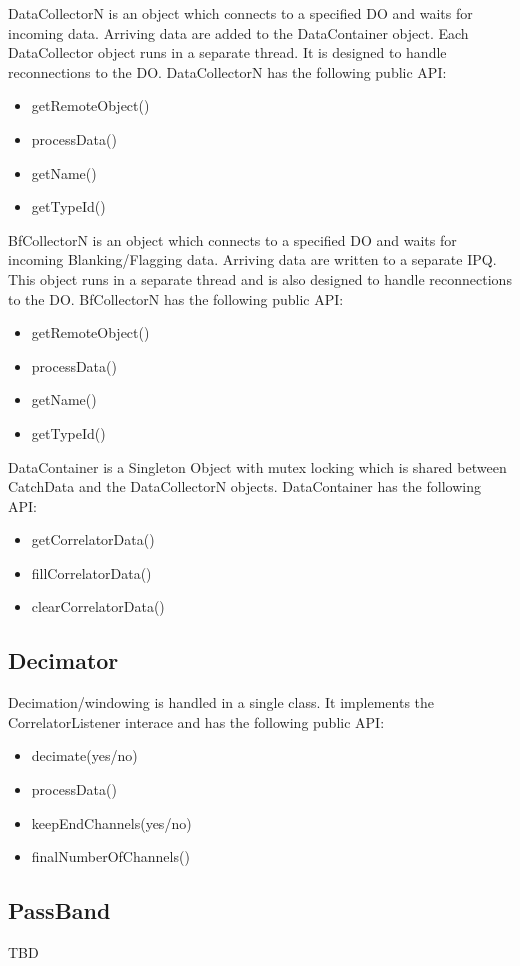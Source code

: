 \documentclass[11pt]{article}
\begin{document}
DataCollectorN is an object which connects to a specified DO and waits for
incoming data. Arriving data are added to the DataContainer object.
Each DataCollector object runs in a separate thread. It is designed to
handle reconnections to the DO. DataCollectorN has
the following public API:
\begin{itemize}
\item getRemoteObject()
\item processData()
\item getName()
\item getTypeId()
\end{itemize}

BfCollectorN is an object which connects to a specified DO and waits for
incoming Blanking/Flagging data. Arriving data are written to a separate
IPQ.
This object runs in a separate thread and is also designed to
handle reconnections to the DO. BfCollectorN has
the following public API:
\begin{itemize}
\item getRemoteObject()
\item processData()
\item getName()
\item getTypeId()
\end{itemize}

DataContainer is a Singleton Object with mutex locking which is shared 
between CatchData and the DataCollectorN objects. DataContainer has the
following API:
\begin{itemize}
\item getCorrelatorData()
\item fillCorrelatorData()
\item clearCorrelatorData()
\end{itemize}

\subsection{Decimator}
Decimation/windowing is handled in a single class. It implements the
CorrelatorListener interace and has the following public API:
\begin{itemize}
\item decimate(yes/no)
\item processData()
\item keepEndChannels(yes/no)
\item finalNumberOfChannels()
\end{itemize}

\subsection{PassBand}
TBD
\end{document}
